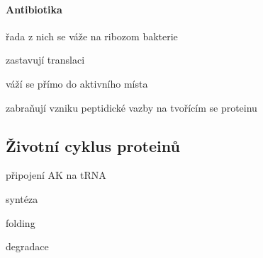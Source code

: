 \documentclass[DIV=8]{scrreprt}
\begin{document}
\paragraph{Antibiotika}
\begin{myItemize}[nosep]
    \item řada z nich se váže na ribozom bakterie
    \item zastavují translaci
    \item váží se přímo do aktivního místa
\begin{myItemize}[nosep]
    \item zabraňují vzniku peptidické vazby na tvořícím se proteinu
\end{myItemize}

\end{myItemize}



\subsection{Životní cyklus proteinů} \label{Životní cyklus proteinů}


\begin{myEnumerate}[nosep]
    \item připojení AK na tRNA
    \item syntéza
    \item folding
    \item degradace
\end{myEnumerate}
\end{document}
